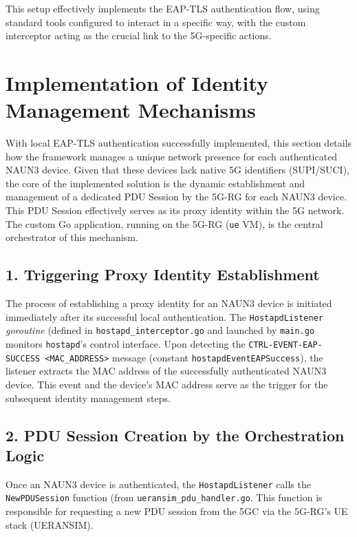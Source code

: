 This setup effectively implements the \ac{EAP-TLS} authentication flow, using standard tools configured to interact in a specific way, with the custom interceptor acting as the crucial link to the \ac{5G}-specific actions.

\section{Implementation of Identity Management Mechanisms}

With local \ac{EAP-TLS} authentication successfully implemented, this section details how the framework manages a unique network presence for each authenticated \ac{NAUN3} device. Given that these devices lack native \ac{5G} identifiers (\ac{SUPI}/\ac{SUCI}), the core of the implemented solution is the dynamic establishment and management of a dedicated \ac{PDU} Session by the \ac{5G-RG} for each \ac{NAUN3} device. This \ac{PDU} Session effectively serves as its proxy identity within the \ac{5G} network. The custom Go application, running on the \ac{5G-RG} (\texttt{ue} \ac{VM}), is the central orchestrator of this mechanism.

\subsection{1. Triggering Proxy Identity Establishment}

The process of establishing a proxy identity for an \ac{NAUN3} device is initiated immediately after its successful local authentication. The \texttt{HostapdListener} \textit{goroutine} (defined in \texttt{hostapd\_interceptor.go} and launched by \texttt{main.go} monitors \texttt{hostapd}'s control interface. Upon detecting the \texttt{CTRL-EVENT-EAP-SUCCESS <MAC\_ADDRESS>} message (constant \texttt{hostapdEventEAPSuccess}), the listener extracts the \ac{MAC} address of the successfully authenticated \ac{NAUN3} device. This event and the device's \ac{MAC} address serve as the trigger for the subsequent identity management steps.

\subsection{2. \acs{PDU} Session Creation by the Orchestration Logic}

Once an \ac{NAUN3} device is authenticated, the \texttt{HostapdListener} calls the \texttt{NewPDUSession} function (from \texttt{ueransim\_pdu\_handler.go}. This function is responsible for requesting a new \ac{PDU} session from the \ac{5GC} via the \ac{5G-RG}'s \ac{UE} stack (UERANSIM).

